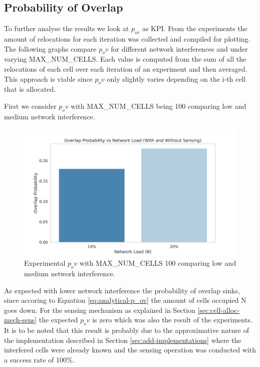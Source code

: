 \documentclass{comnets-thesis}
\begin{document}
\subsection*{Probability of Overlap}
To further analyse the results we look at $p_{ov}$ as \ac{KPI}. From the experiments the amount of relocations for each iteration was collected and compiled for plotting.
The following graphs compare $p_ov$ for different network interferences and under varying MAX\_NUM\_CELLS. Each value is computed from the sum of all the relocations of each cell over each iteration of an experiment and then averaged. This approach is viable since $p_ov$ only slightly varies depending on the i-th cell that is allocated.

First we consider $p_ov$ with MAX\_NUM\_CELLS being 100 comparing low and medium network interference.

\begin{figure}[H]
    \centering
    \includegraphics[width=1\textwidth]{./images/experiment_N100_pov.png}
    \caption{Experimental $p_ov$ with MAX\_NUM\_CELLS 100 comparing low and medium network interference.}
    \label{fig:pov-graph-n-100}
\end{figure}

As expected with lower network interference the probability of overlap sinks, since accoring to Equation \ref{eq:analytical-p_ov} the amount of cells occupied N goes down. For the sensing mechanism as explained in Section \ref{sec:cell-alloc-mech-sens} the expected $p_ov$ is zero which was also the result of the experiments. It is to be noted that this result is probably due to the approximative nature of the implementation described in Section \ref{sec:add-implementations} where the interfered cells were already known and the sensing operation was conducted with a success rate of 100\%.
\end{document}
